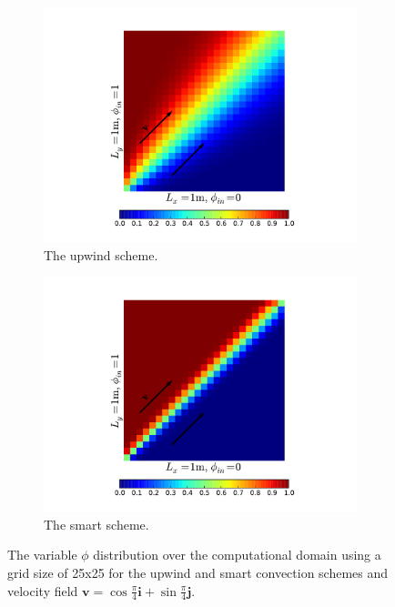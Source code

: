 \documentclass[a4paper, 11pt]{article}
\begin{document}
\begin{figure}[h]
\centering
\begin{subfigure}{0.5\textwidth}
  \centering
  \includegraphics[width=1\linewidth]{up26.pdf}
  \caption{The upwind scheme.}
  \label{fig:sub1}
\end{subfigure}%
\begin{subfigure}{0.5\textwidth}
  \centering
  \includegraphics[width=1\linewidth]{smart26.pdf}
  \caption{The smart scheme.}
  \label{fig:sub2}
\end{subfigure}
\caption{The variable $\phi$ distribution over the computational domain using a grid size of 25x25 for the upwind and smart convection schemes and velocity field $\textbf{v}=\cos\frac{\pi}{4}\textbf{i}+\sin\frac{\pi}{4}\textbf{j}$.}
\label{fig:sub2}
\end{figure}
\end{document}
